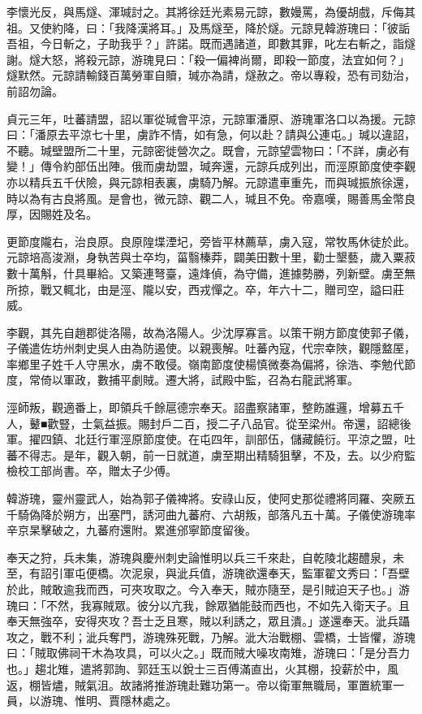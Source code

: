 \begin{pinyinscope}
 李懷光反，與馬燧、渾瑊討之。其將徐廷光素易元諒，數嫚罵，為優胡戲，斥侮其祖。又使約降，曰：「我降漢將耳。」及馬燧至，降於燧。元諒見韓游瑰曰：「彼詬吾祖，今日斬之，子助我乎？」許諾。既而遇諸道，即數其罪，叱左右斬之，詣燧謝。燧大怒，將殺元諒，游瑰見曰：「殺一偏裨尚爾，即殺一節度，法宜如何？」燧默然。元諒請輸錢百萬勞軍自贖，瑊亦為請，燧赦之。帝以專殺，恐有司劾治，前詔勿論。



 貞元三年，吐蕃請盟，詔以軍從瑊會平涼，元諒軍潘原、游瑰軍洛口以為援。元諒曰：「潘原去平涼七十里，虜詐不情，如有急，何以赴？請與公連屯。」瑊以違詔，不聽。瑊壁盟所二十里，元諒密徙營次之。既會，元諒望雲物曰：「不詳，虜必有變！」傳令約部伍出陣。俄而虜劫盟，瑊奔還，元諒兵成列出，而涇原節度使李觀亦以精兵五千伏險，與元諒相表裏，虜騎乃解。元諒遣車重先，而與瑊振旅徐還，時以為有古良將風。是會也，微元諒、觀二人，瑊且不免。帝嘉嘆，賜善馬金幣良厚，因賜姓及名。



 更節度隴右，治良原。良原隍堞湮圮，旁皆平林薦草，虜入寇，常牧馬休徒於此。元諒培高浚淵，身執苦與士卒均，菑翳榛莽，闢美田數十里，勸士墾藝，歲入粟菽數十萬斛，什具畢給。又築連弩臺，遠烽偵，為守備，進據勢勝，列新壁。虜至無所掠，戰又輒北，由是涇、隴以安，西戎憚之。卒，年六十二，贈司空，謚曰莊威。



 李觀，其先自趙郡徙洛陽，故為洛陽人。少沈厚寡言。以策干朔方節度使郭子儀，子儀遣佐坊州刺史吳人由為防遏使。以親喪解。吐蕃內寇，代宗幸陜，觀隱盩厔，率鄉里子姓千人守黑水，虜不敢侵。嶺南節度使楊慎微奏為偏將，徐浩、李勉代節度，常倚以軍政，數捕平劇賊。遷大將，試殿中監，召為右龍武將軍。



 涇師叛，觀適番上，即領兵千餘扈德宗奉天。詔盡察諸軍，整飭誰邏，增募五千人，鼙■歡豎，士氣益振。賜封戶二百，授二子八品官。從至梁州。帝還，詔總後軍。擢四鎮、北廷行軍涇原節度使。在屯四年，訓部伍，儲藏饒衍。平涼之盟，吐蕃不得志。是年，觀入朝，前一日就道，虜至期出精騎狙擊，不及，去。以少府監檢校工部尚書。卒，贈太子少傅。



 韓游瑰，靈州靈武人，始為郭子儀裨將。安祿山反，使阿史那從禮將同羅、突厥五千騎偽降於朔方，出塞門，誘河曲九蕃府、六胡叛，部落凡五十萬。子儀使游瑰率辛京杲擊破之，九蕃府還附。累進邠寧節度留後。



 奉天之狩，兵未集，游瑰與慶州刺史論惟明以兵三千來赴，自乾陵北趨醴泉，未至，有詔引軍屯便橋。次泥泉，與泚兵值，游瑰欲還奉天，監軍翟文秀曰：「吾壁於此，賊敢逾我而西，可夾攻取之。今入奉天，賊亦隨至，是引賊迫天子也。」游瑰曰：「不然，我寡賊眾。彼分以亢我，餘眾猶能鼓而西也，不如先入衛天子。且奉天無強卒，安得夾攻？吾士乏且寒，賊以利誘之，眾且潰。」遂還奉天。泚兵躡攻之，戰不利；泚兵奪門，游瑰殊死戰，乃解。泚大治戰棚、雲橋，士皆懼，游瑰曰：「賊取佛祠干木為攻具，可以火之。」既而賊大噪攻南雉，游瑰曰：「是分吾力也。」趨北雉，遣將郭詢、郭廷玉以銳士三百傅滿直出，火其棚，投薪於中，風返，棚皆燼，賊氣沮。故諸將推游瑰赴難功第一。帝以衛軍無職局，軍置統軍一員，以游瑰、惟明、賈隱林處之。




\end{pinyinscope}
